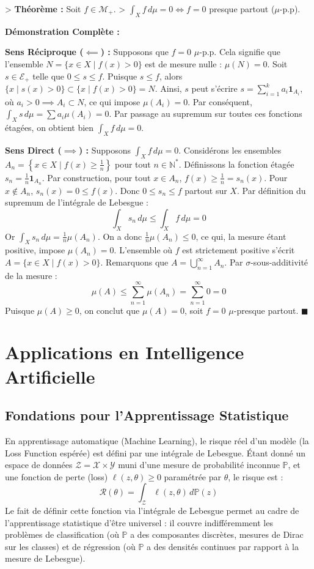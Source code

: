 \documentclass[11pt,a4paper]{article}
\begin{document}
> \textbf{Théorème :} Soit $f \in \mathcal{M}_+$.
> $\int_X f \, d\mu = 0 \iff f = 0$ presque partout ($\mu$-p.p).

\textbf{Démonstration Complète :}

\textbf{Sens Réciproque ($\impliedby$) :}
Supposons que $f = 0$ $\mu$-p.p. Cela signifie que l'ensemble $N = \{x \in X \mid f(x) > 0\}$ est de mesure nulle : $\mu(N) = 0$.
Soit $s \in \mathcal{E}_+$ telle que $0 \le s \le f$.
Puisque $s \le f$, alors $\{x \mid s(x) > 0\} \subset \{x \mid f(x) > 0\} = N$.
Ainsi, $s$ peut s'écrire $s = \sum_{i=1}^k a_i \mathbf{1}_{A_i}$, où $a_i > 0 \implies A_i \subset N$, ce qui impose $\mu(A_i) = 0$.
Par conséquent, $\int_X s \, d\mu = \sum a_i \mu(A_i) = 0$.
Par passage au supremum sur toutes ces fonctions étagées, on obtient bien $\int_X f \, d\mu = 0$.

\textbf{Sens Direct ($\implies$) :}
Supposons $\int_X f \, d\mu = 0$.
Considérons les ensembles $A_n = \left\lbrace x \in X \mid f(x) \ge \frac{1}{n} \right\rbrace$ pour tout $n \in \mathbb{N}^*$.
Définissons la fonction étagée $s_n = \frac{1}{n} \mathbf{1}_{A_n}$.
Par construction, pour tout $x \in A_n$, $f(x) \ge \frac{1}{n} = s_n(x)$. Pour $x \notin A_n$, $s_n(x) = 0 \le f(x)$.
Donc $0 \le s_n \le f$ partout sur $X$.
Par définition du supremum de l'intégrale de Lebesgue :
$$\int_X s_n \, d\mu \le \int_X f \, d\mu = 0$$
Or $\int_X s_n \, d\mu = \frac{1}{n} \mu(A_n)$.
On a donc $\frac{1}{n} \mu(A_n) \le 0$, ce qui, la mesure étant positive, impose $\mu(A_n) = 0$.
L'ensemble où $f$ est strictement positive s'écrit $A = \{x \in X \mid f(x) > 0\}$.
Remarquons que $A = \bigcup_{n=1}^\infty A_n$.
Par $\sigma$-sous-additivité de la mesure :
$$\mu(A) \le \sum_{n=1}^\infty \mu(A_n) = \sum_{n=1}^\infty 0 = 0$$
Puisque $\mu(A) \ge 0$, on conclut que $\mu(A) = 0$, soit $f = 0$ $\mu$-presque partout. $\blacksquare$

\section{Applications en Intelligence Artificielle}

\subsection{Fondations pour l'Apprentissage Statistique}

En apprentissage automatique (Machine Learning), le risque réel d'un modèle (la Loss Function espérée) est défini par une intégrale de Lebesgue.
Étant donné un espace de données $\mathcal{Z} = \mathcal{X} \times \mathcal{Y}$ muni d'une mesure de probabilité inconnue $\mathbb{P}$, et une fonction de perte (loss) $\ell(z, \theta) \ge 0$ paramétrée par $\theta$, le risque est :
$$\mathcal{R}(\theta) = \int_{\mathcal{Z}} \ell(z, \theta) \, d\mathbb{P}(z)$$
Le fait de définir cette fonction via l'intégrale de Lebesgue permet au cadre de l'apprentissage statistique d'être universel : il couvre indifféremment les problèmes de classification (où $\mathbb{P}$ a des composantes discrètes, mesures de Dirac sur les classes) et de régression (où $\mathbb{P}$ a des densités continues par rapport à la mesure de Lebesgue).
\end{document}
